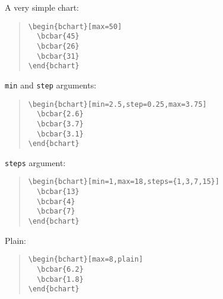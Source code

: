 \documentclass{article}
\begin{document}
A very simple chart:
\begin{quote}\small
\begin{verbatim}
\begin{bchart}[max=50]
  \bcbar{45}
  \bcbar{26}
  \bcbar{31}
\end{bchart}
\end{verbatim}
\end{quote}
\begin{quote}
\begin{bchart}[max=50]
\end{bchart}
\end{quote}
\texttt{min} and \texttt{step} arguments:
\begin{quote}\small
\begin{verbatim}
\begin{bchart}[min=2.5,step=0.25,max=3.75]
  \bcbar{2.6}
  \bcbar{3.7}
  \bcbar{3.1}
\end{bchart}
\end{verbatim}
\end{quote}
\begin{quote}
\begin{bchart}[min=2.5,step=0.25,max=3.75]
\end{bchart}
\end{quote}
\texttt{steps} argument:
\begin{quote}\small
\begin{verbatim}
\begin{bchart}[min=1,max=18,steps={1,3,7,15}]
  \bcbar{13}
  \bcbar{4}
  \bcbar{7}
\end{bchart}
\end{verbatim}
\end{quote}
\begin{quote}
\begin{bchart}[min=1,max=18,steps={1,3,7,15}]
\end{bchart}
\end{quote}
Plain:
\begin{quote}\small
\begin{verbatim}
\begin{bchart}[max=8,plain]
  \bcbar{6.2}
  \bcbar{1.8}
\end{bchart}
\end{verbatim}
\end{quote}
\begin{quote}
\begin{bchart}[max=8,plain]
\end{bchart}
\end{quote}
\end{document}
